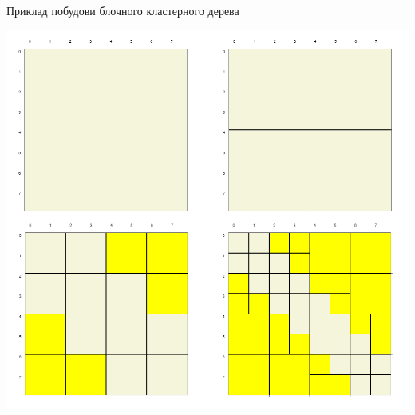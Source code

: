 \documentclass[12pt]{beamer}
\begin{document}
\begin{frame}{Приклад побудови блочного кластерного дерева}
	\begin{block}{}
		\centering\includegraphics[scale=0.27]{1_3}
	\end{block}
\end{frame}
\end{document}

